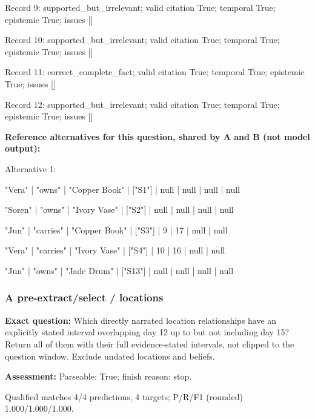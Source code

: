 Record 9: supported\_but\_irrelevant; valid citation True; temporal True; epistemic True; issues []\par

Record 10: supported\_but\_irrelevant; valid citation True; temporal True; epistemic True; issues []\par

Record 11: correct\_complete\_fact; valid citation True; temporal True; epistemic True; issues []\par

Record 12: supported\_but\_irrelevant; valid citation True; temporal True; epistemic True; issues []\par

\noindent\textbf{Reference alternatives for this question, shared by A and B (not model output):}

\noindent Alternative 1:

"Vera" | "owns" | "Copper Book" | ["S1"] | null | null | null | null\par\smallskip

"Soren" | "owns" | "Ivory Vase" | ["S2"] | null | null | null | null\par\smallskip

"Jun" | "carries" | "Copper Book" | ["S3"] | 9 | 17 | null | null\par\smallskip

"Vera" | "carries" | "Ivory Vase" | ["S4"] | 10 | 16 | null | null\par\smallskip

"Jun" | "owns" | "Jade Drum" | ["S13"] | null | null | null | null\par\smallskip

\subsubsection*{A pre-extract/select / locations}

\noindent\textbf{Exact question:} Which directly narrated location relationships have an explicitly stated interval overlapping day 12 up to but not including day 15? Return all of them with their full evidence-stated intervals, not clipped to the question window. Exclude undated locations and beliefs.\par

\noindent\textbf{Assessment:} Parseable: True; finish reason: stop.

Qualified matches 4/4 predictions, 4 targets; P/R/F1 (rounded) 1.000/1.000/1.000.\par

